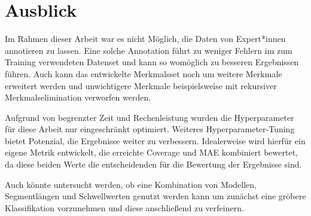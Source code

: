 \section{Ausblick}

Im Rahmen dieser Arbeit war es nicht Möglich, die Daten von Expert*innen annotieren zu lassen. Eine solche Annotation führt zu weniger Fehlern im zum Training verwendeten Datenset und kann so womöglich zu besseren Ergebnissen führen. Auch kann das entwickelte Merkmalsset noch um weitere Merkmale erweitert werden und unwichtigere Merkmale beispielsweise mit rekursiver Merkmalselimination verworfen werden.

Aufgrund von begrenzter Zeit und Rechenleistung wurden die Hyperparameter für diese Arbeit nur eingeschränkt optimiert. Weiteres Hyperparameter-Tuning bietet Potenzial, die Ergebnisse weiter zu verbessern. Idealerweise wird hierfür ein eigene Metrik entwickelt, die erreichte Coverage und \ac{MAE} kombiniert bewertet, da diese beiden Werte die entscheidenden für die Bewertung der Ergebnisse sind.

Auch könnte untersucht werden, ob eine Kombination von Modellen, Segmentlängen und Schwellwerten genutzt werden kann um zunächst eine gröbere Klassifikation vorzunehmen und diese anschließend zu verfeinern.




